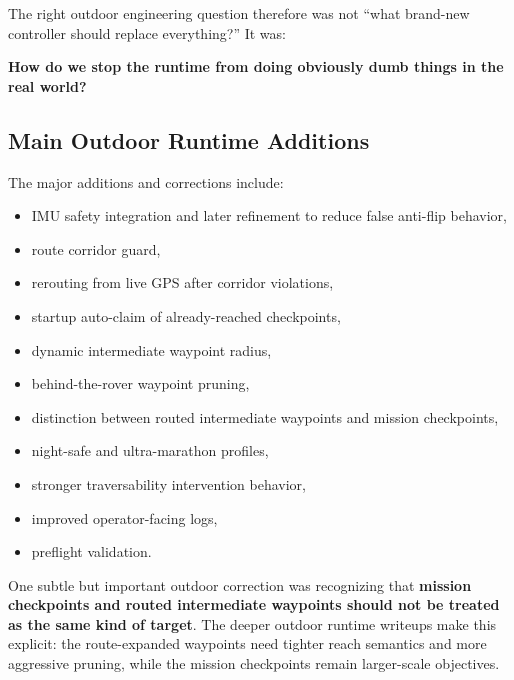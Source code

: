 \documentclass[11pt]{article}
\begin{document}
The right outdoor engineering question therefore was not ``what brand-new controller should replace everything?'' It was:
\begin{center}
\textbf{How do we stop the runtime from doing obviously dumb things in the real world?}
\end{center}

\subsection{Main Outdoor Runtime Additions}
The major additions and corrections include:
\begin{itemize}[leftmargin=*]
  \item IMU safety integration and later refinement to reduce false anti-flip behavior,
  \item route corridor guard,
  \item rerouting from live GPS after corridor violations,
  \item startup auto-claim of already-reached checkpoints,
  \item dynamic intermediate waypoint radius,
  \item behind-the-rover waypoint pruning,
  \item distinction between routed intermediate waypoints and mission checkpoints,
  \item night-safe and ultra-marathon profiles,
  \item stronger traversability intervention behavior,
  \item improved operator-facing logs,
  \item preflight validation.
\end{itemize}

One subtle but important outdoor correction was recognizing that \textbf{mission checkpoints and routed intermediate waypoints should not be treated as the same kind of target}. The deeper outdoor runtime writeups make this explicit: the route-expanded waypoints need tighter reach semantics and more aggressive pruning, while the mission checkpoints remain larger-scale objectives.
\end{document}
